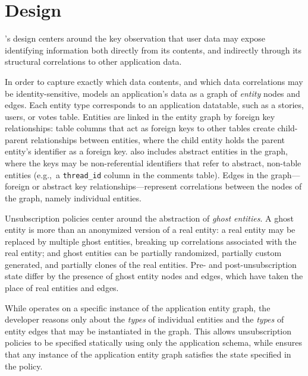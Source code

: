 \section{Design}


\sys's design centers around the key observation that user data may expose identifying information
both directly from its contents, and indirectly through its structural correlations to other
application data. 

In order to capture exactly which data contents, and which data correlations may be
identity-sensitive, \sys models an application's data as a graph of \emph{entity} nodes and edges.
Each entity type corresponds to an application datatable, such as a stories, users, or votes table.
Entities are linked in the entity graph by foreign key relationships: table columns that act as
foreign keys to other tables create child-parent relationships between entities, where the child
entity holds the parent entity's identifier as a foreign key. \sys also includes
abstract entities in the graph, where the keys may be non-referential identifiers that refer to
abstract, non-table entities (e.g.,\ a \texttt{thread\_id} column in the comments table).  Edges in
the graph---foreign or abstract key relationships---represent correlations between the nodes of the
graph, namely individual entities.

Unsubscription policies center around the abstraction of \emph{ghost entities}. A ghost entity is
more than an anonymized version of a real entity: a real entity may be replaced by multiple ghost
entities, breaking up correlations associated with the real entity; and ghost entities can be
partially randomized, partially custom generated, and partially clones of the real entities. 
Pre- and post-unsubscription state differ by the presence of ghost entity nodes and edges, which
have taken the place of real entities and edges.

While \sys operates on a specific instance of the application entity graph, the developer reasons
only about the \emph{types} of individual entities and the \emph{types} of entity edges that may be
instantiated in the graph. This allows unsubscription policies to be specified statically using only
the application schema, while \sys ensures that any instance of the application entity graph
satisfies the state specified in the policy.

